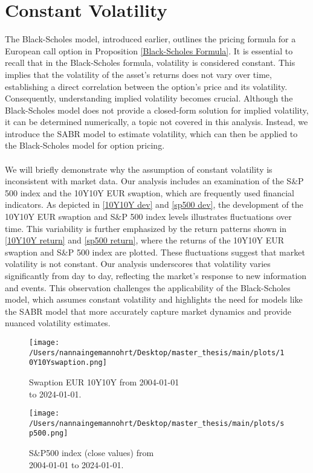 \section{Constant Volatility}
The Black-Scholes model, introduced earlier, outlines the pricing formula for a European call option in 
Proposition \autoref{Black-Scholes Formula}. It is  essential to recall that in the Black-Scholes formula, 
volatility is considered constant. This implies that the volatility of the asset's returns does not vary over time,
establishing a direct correlation between the option's price and its volatility. Consequently, 
understanding implied volatility becomes crucial. Although the Black-Scholes model does not provide 
a closed-form solution for implied volatility, it can be determined numerically, a topic not covered 
in this analysis. Instead, we introduce the SABR model to estimate volatility, which can then be 
applied to the Black-Scholes model for option pricing.
\\\\
We will briefly demonstrate why the assumption of constant volatility is inconsistent with market data. 
Our analysis includes an examination of the S$\&$P 500 index and the 10Y10Y EUR swaption, which are frequently used 
financial indicators. As depicted in \autoref{10Y10Y dev} and \autoref{sp500 dev}, the development of the 10Y10Y EUR swaption 
and S$\&$P 500 index levels illustrates fluctuations over time. This variability is further emphasized by the return patterns 
shown in \autoref{10Y10Y return} and \autoref{sp500 return}, where the returns of the 10Y10Y EUR swaption and S$\&$P 500 index are plotted. 
These fluctuations suggest that market volatility is not constant. Our analysis underscores that volatility varies 
significantly from day to day, reflecting the market's response to new information and events. This observation challenges 
the applicability of the Black-Scholes model, which assumes constant volatility and highlights the need for models like the 
SABR model that more accurately capture market dynamics and provide nuanced volatility estimates.




\newpage
\begin{figure}[h]
    \centering
    \begin{minipage}{0.5\textwidth}
        \texttt{[image: /Users/nannaingemannohrt/Desktop/master\_thesis/main/plots/10Y10Yswaption.png]}
        \caption{Swaption EUR 10Y10Y from  2004-01-01 \\ to 2024-01-01.}
        \label{10Y10Y dev}
    \end{minipage}\hfill 
    \begin{minipage}{0.5\textwidth}
        \texttt{[image: /Users/nannaingemannohrt/Desktop/master\_thesis/main/plots/sp500.png]}
        \caption{S$\&$P500 index (close values) from \\ 2004-01-01 to 2024-01-01.}
        \label{sp500 dev}
    \end{minipage}
\end{figure}

